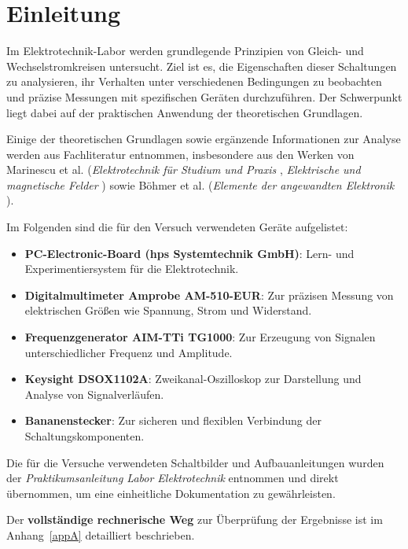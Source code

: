 
\section{Einleitung}
Im Elektrotechnik-Labor werden grundlegende Prinzipien von Gleich- und Wechselstromkreisen untersucht. Ziel ist es, die Eigenschaften dieser Schaltungen zu analysieren, ihr Verhalten unter verschiedenen Bedingungen zu beobachten und präzise Messungen mit spezifischen Geräten durchzuführen. Der Schwerpunkt liegt dabei auf der praktischen Anwendung der theoretischen Grundlagen.

Einige der theoretischen Grundlagen sowie ergänzende Informationen zur Analyse werden aus Fachliteratur entnommen, insbesondere aus den Werken von Marinescu et al. (\textit{Elektrotechnik für Studium und Praxis} \cite{marinescu2021}, \textit{Elektrische und magnetische Felder} \cite{marinescu2012}) sowie Böhmer et al. (\textit{Elemente der angewandten Elektronik} \cite{böhmer2114}).

Im Folgenden sind die für den Versuch verwendeten Geräte aufgelistet:

\begin{itemize}
    \item \textbf{PC-Electronic-Board (hps Systemtechnik GmbH)}: Lern- und Experimentiersystem für die Elektrotechnik.
    \item \textbf{Digitalmultimeter Amprobe AM-510-EUR}: Zur präzisen Messung von elektrischen Größen wie Spannung, Strom und Widerstand.
    \item \textbf{Frequenzgenerator AIM-TTi TG1000}: Zur Erzeugung von Signalen unterschiedlicher Frequenz und Amplitude.
    \item \textbf{Keysight DSOX1102A}: Zweikanal-Oszilloskop zur Darstellung und Analyse von Signalverläufen.
    \item \textbf{Bananenstecker}: Zur sicheren und flexiblen Verbindung der Schaltungskomponenten.
\end{itemize}

Die für die Versuche verwendeten Schaltbilder und Aufbauanleitungen wurden der \textit{Praktikumsanleitung Labor Elektrotechnik} \cite{praktikumsanleitung2024} entnommen und direkt übernommen, um eine einheitliche Dokumentation zu gewährleisten.

Der \textbf{vollständige rechnerische Weg} zur Überprüfung der Ergebnisse ist im Anhang~\ref{appA} detailliert beschrieben.

\newpage
